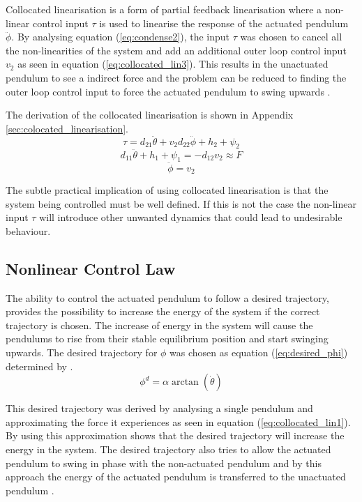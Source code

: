 Collocated linearisation is a form of partial feedback linearisation where a non-linear control input $\tau$ is used to linearise the response of the actuated pendulum $\ddot{\phi}$. By analysing equation (\ref{eq:condense2}), the input $\tau$ was chosen to cancel all the non-linearities of the system and add an additional outer loop control input $v_{2}$ as seen in equation (\ref{eq:collocated_lin3}). This results in the unactuated pendulum to see a indirect force and the problem can be reduced to finding the outer loop control input to force the actuated pendulum to swing upwards \citep{spong_swingup}.

 The derivation of the collocated linearisation is shown in Appendix \ref{sec:colocated_linearisation}.
\begin{equation} \label{eq:collocated_lin3}
\tau = d_{21}\ddot{\theta} + v_{2}d_{22}\ddot{\phi} + h_{2} + \psi_{2}
\end{equation}
\begin{equation} \label{eq:collocated_lin1}
d_{11}\ddot{\theta} + h_{1} + \psi_{1} = -d_{12}v_{2} \approx F
\end{equation}
\begin{equation} \label{eq:collocated_lin2}
\ddot{\phi} = v_{2}
\end{equation}

The subtle practical implication of using collocated linearisation is that the system being controlled must be well defined. If this is not the case the non-linear input $\tau$ will introduce other unwanted dynamics that could lead to undesirable behaviour.

\subsection{Nonlinear Control Law}

The ability to control the actuated pendulum to follow a desired trajectory, provides the possibility to increase the energy of the system if the correct trajectory is chosen. The increase of energy in the system will cause the pendulums to rise from their stable equilibrium position and start swinging upwards. The desired trajectory for ${\phi}$ was chosen as equation (\ref{eq:desired_phi}) determined by \citet{spong_swingup}.
\begin{equation} \label{eq:desired_phi}
\phi^{d} =  \alpha \arctan(\dot{\theta})
\end{equation}

This desired trajectory was derived by analysing a single pendulum and approximating the force it experiences as seen in equation (\ref{eq:collocated_lin1}). By using this approximation \citet{spong_swingup} shows that the desired trajectory will increase the energy in the system. The desired trajectory also tries to allow the actuated pendulum to swing in phase with the non-actuated pendulum and by this approach the energy of the actuated pendulum is transferred to the unactuated pendulum \citep{spong_swingup}.\\

